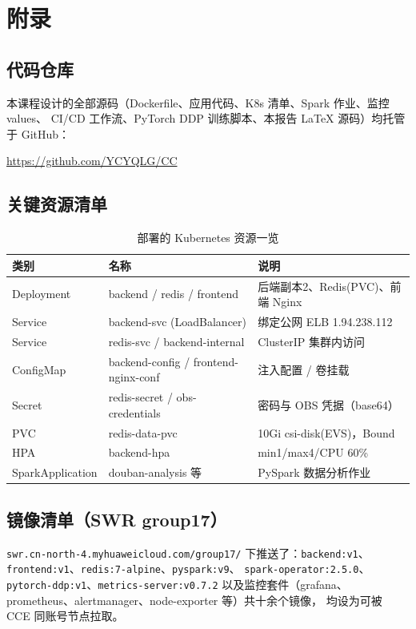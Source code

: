 \chapter{附录}

\section{代码仓库}

本课程设计的全部源码（Dockerfile、应用代码、K8s 清单、Spark 作业、监控 values、
CI/CD 工作流、PyTorch DDP 训练脚本、本报告 \LaTeX{} 源码）均托管于 GitHub：

\begin{center}
\url{https://github.com/YCYQLG/CC}
\end{center}

\section{关键资源清单}

\begin{table}[htbp]\centering
\caption{部署的 Kubernetes 资源一览}\label{tab:resources}
\begin{tabular}{lll}
\toprule
类别 & 名称 & 说明 \\
\midrule
Deployment & backend / redis / frontend & 后端副本2、Redis(PVC)、前端 Nginx \\
Service    & backend-svc (LoadBalancer) & 绑定公网 ELB 1.94.238.112 \\
Service    & redis-svc / backend-internal & ClusterIP 集群内访问 \\
ConfigMap  & backend-config / frontend-nginx-conf & 注入配置 / 卷挂载 \\
Secret     & redis-secret / obs-credentials & 密码与 OBS 凭据（base64） \\
PVC        & redis-data-pvc & 10Gi csi-disk(EVS)，Bound \\
HPA        & backend-hpa & min1/max4/CPU 60\% \\
SparkApplication & douban-analysis 等 & PySpark 数据分析作业 \\
\bottomrule
\end{tabular}
\end{table}

\section{镜像清单（SWR group17）}

\lstinline!swr.cn-north-4.myhuaweicloud.com/group17/! 下推送了：\lstinline!backend:v1!、
\lstinline!frontend:v1!、\lstinline!redis:7-alpine!、\lstinline!pyspark:v9!、
\lstinline!spark-operator:2.5.0!、\lstinline!pytorch-ddp:v1!、\lstinline!metrics-server:v0.7.2!
以及监控套件（grafana、prometheus、alertmanager、node-exporter 等）共十余个镜像，
均设为可被 CCE 同账号节点拉取。
